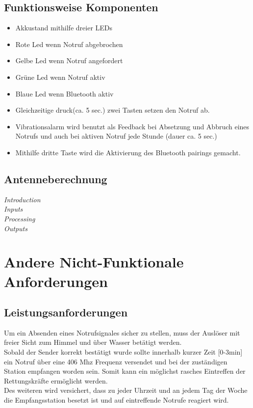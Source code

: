\subsection{Funktionsweise Komponenten}
\begin{itemize}
	\item Akkustand mithilfe dreier LEDs
	\item Rote Led wenn Notruf abgebrochen
	\item Gelbe Led wenn Notruf angefordert
	\item Grüne Led wenn Notruf aktiv
	\item Blaue Led wenn Bluetooth aktiv
	\item Gleichzeitige druck(ca. 5 sec.) zwei Tasten setzen den Notruf ab.
	\item Vibrationsalarm wird benutzt als Feedback bei Absetzung und Abbruch eines Notrufs und auch bei aktiven Notruf jede Stunde (dauer ca. 5 sec.)
	\item Mithilfe dritte Taste wird die Aktivierung des Bluetooth pairings gemacht.
\end{itemize}
\subsection{Antenneberechnung}


\noindent \textit{\large Introduction} \\
\textit{\large Inputs} \\
\textit{\large Processing} \\
\textit{\large Outputs} \\

\newpage

\section{Andere Nicht-Funktionale Anforderungen}

\subsection{Leistungsanforderungen}
Um ein Absenden eines Notrufsignales sicher zu stellen, muss der Auslöser mit freier Sicht zum Himmel und über Wasser
betätigt werden. \\
Sobald der Sender korrekt bestätigt wurde sollte innerhalb kurzer Zeit [0-3min] ein Notruf über
eine 406 Mhz Frequenz versendet und bei der zuständigen Station empfangen worden sein. Somit kann ein möglichst rasches Eintreffen der Rettungskräfte ermöglicht werden.\\
Des weiteren wird versichert, dass zu jeder Uhrzeit und an jedem Tag der Woche die Empfangsstation besetzt ist und 
auf eintreffende Notrufe reagiert wird.


